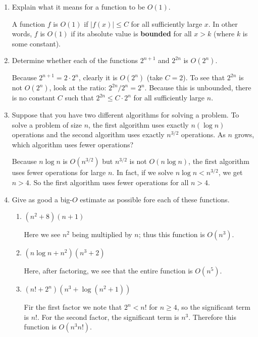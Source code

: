 \documentclass[11pt]{article}
\begin{document}
\begin{enumerate}[label=\textbf{\arabic*.}]
	\item Explain what it means for a function to be $O(1)$.
	
	A function $f$ is $O(1)$ if $|f(x)| \leq C$ for all sufficiently large $x$. In other words, $f$ is $O(1)$ if its absolute value is \textbf{bounded} for all $x > k$ (where $k$ is some constant).
	
	\item Determine whether each of the functions $2^{n + 1}$ and $2^{2n}$ is $O(2^n)$.
	
	Because $2^{n + 1} = 2 \cdot 2^n$, clearly it is $O(2^n)$ (take $C = 2$). To see that $2^{2n}$ is not $O(2^n)$, look at the ratio: $2^{2n} / 2^n = 2^n$. Because this is unbounded, there is no constant $C$ such that $2^{2n} \leq C \cdot 2^n$ for all sufficiently large $n$.
	
	\item Suppose that you have two different algorithms for solving a problem. To solve a problem of size $n$, the first algorithm uses exactly $n(\log n)$ operations and the second algorithm uses exactly $n^{3/2}$ operations. As $n$ grows, which algorithm uses fewer operations?
	
	Because $n \log n$ is $O(n^{3/2})$ but $n^{3/2}$ is not $O(n \log n)$, the first algorithm uses fewer operations for large $n$. In fact, if we solve $n \log n < n^{3/2}$, we get $n > 4$. So the first algorithm uses fewer operations for all $n > 4$.
	
	\item Give as good a big-$O$ estimate as possible fore each of these functions.
	
	\begin{enumerate}[label=\textbf{\alph*)}]
		\item $(n^2 + 8)(n + 1)$
		
		Here we see $n^2$ being multiplied by $n$; thus this function is $O(n^3)$.
		
		\item $(n \log n + n^2)(n^3 + 2)$
		
		Here, after factoring, we see that the entire function is $O(n^5)$.
		
		\item $(n! + 2^n)(n^3 + \log(n^2 + 1))$
		
		Fir the first factor we note that $2^n < n!$ for $n \geq 4$, so the significant term is $n!$. For the second factor, the significant term is $n^3$. Therefore this function is $O(n^3n!)$.
	\end{enumerate}
	

\end{enumerate}
\end{document}
